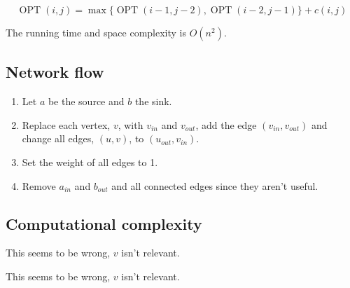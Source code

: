 \documentclass[a4paper]{article}
\newenvironment{task}[1]
{
	\begin{description}[align=right]
		\item [#1]
}{		%
	\end{description}
}
\DeclareMathOperator{\OPT}{OPT}
\DeclareMathOperator{\*}{\cdot}
\begin{document}
\begin{task}{6. (a)}
\end{task}

\begin{task}{(b)}
	\[\OPT(i,j)=\max\{\OPT(i-1,j-2), \OPT(i-2,j-1)\}+c(i,j)\]
\end{task}

\begin{task}{(c)}
	\qquad The running time and space complexity is $O(n^2)$.
\end{task}

\subsection*{Network flow}

\begin{task}{7. (a)}
\end{task}

\begin{task}{(b)}
	\qquad 
	\begin{enumerate}
		\item Let $a$ be the source and $b$ the sink.
		\item Replace each vertex, $v$, with $v_{in}$ and $v_{out}$, add the edge $(v_{in},v_{out})$ and change all edges, $(u,v)$, to $(u_{out},v_{in})$.
		\item Set the weight of all edges to 1.
		\item Remove $a_{in}$ and $b_{out}$ and all connected edges since they aren't useful.
	\end{enumerate} 
\end{task}

\subsection*{Computational complexity}

\begin{task}{8. (a)}
\end{task}

\begin{task}{(b)}
	 This seems to be wrong, $v$ isn't relevant.
\end{task}

\begin{task}{(c)}
\end{task}

\begin{task}{(d)}
	\qquad This seems to be wrong, $v$ isn't relevant.
\end{task}
\end{document}
